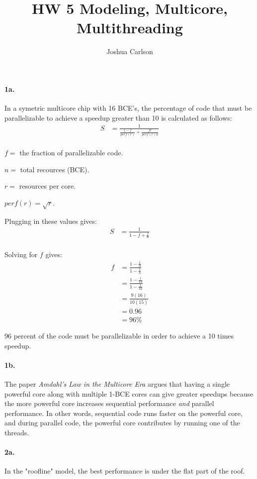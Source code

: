 \documentclass[letterpaper]{article}
\author{Joshua Carlson}
\title{HW 5 Modeling, Multicore, Multithreading}
\begin{document}
\maketitle

\paragraph{1a.} In a symetric multicore chip with 16 BCE's, the percentage of
code that must be parallelizable to achieve a speedup greater than 10 is
calculated as follows:
\begin{align*}
    S &= \frac{1}{\frac{1 - f}{perf(r)} + \frac{fr}{perf(r)n}} \\
\end{align*}

$f =$ the fraction of parallelizable code.

$n =$ total recources (BCE).

$r =$ resources per core.

$perf(r) = \sqrt{r}$.

Plugging in these values gives:
\begin{align*}
    S &= \frac{1}{1 - f + \frac{f}{n}} \\
\end{align*}

Solving for $f$ gives:
\begin{align*}
    f &= \frac{1 - \frac{1}{S}}{1 - \frac{1}{n}} \\
      &= \frac{1 - \frac{1}{10}}{1 - \frac{1}{16}} \\
      &= \frac{9(16)}{10(15)} \\
      &= 0.96 \\
      &= 96\%
\end{align*}

96 percent of the code must be parallelizable in order to achieve a 10 times
speedup.

\paragraph{1b.} The paper \emph{Amdahl's Law in the Multicore Era} argues that
having a single powerful core along with multiple 1-BCE cores can give greater
speedups because the more powerful core increases sequential performance
\emph{and} parallel performance. In other words, sequential code runs faster on
the powerful core, and during parallel code, the powerful core contributes by
running one of the threads.

\paragraph{2a.} In the "roofline" model, the best performance is under the flat
part of the roof.
\end{document}
